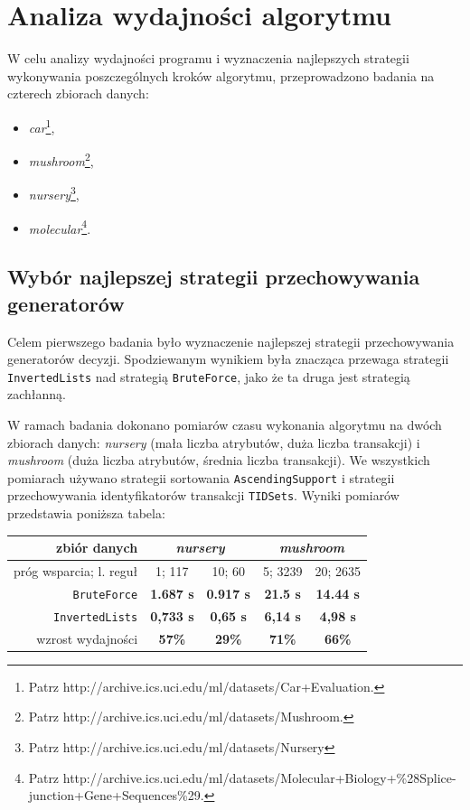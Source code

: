 \documentclass[a4paper,10pt]{article}
\begin{document}
\section{Analiza wydajności algorytmu} \label{sec:anal}
W celu analizy wydajności programu i wyznaczenia najlepszych strategii wykonywania poszczególnych kroków algorytmu, przeprowadzono badania na czterech zbiorach danych:

\begin{itemize}
 \item \emph{car}\footnote{Patrz http://archive.ics.uci.edu/ml/datasets/Car+Evaluation.},
 \item \emph{mushroom}\footnote{Patrz http://archive.ics.uci.edu/ml/datasets/Mushroom.},
 \item \emph{nursery}\footnote{Patrz http://archive.ics.uci.edu/ml/datasets/Nursery},
 \item \emph{molecular}\footnote{Patrz http://archive.ics.uci.edu/ml/datasets/Molecular+Biology+\%28Splice-junction+Gene+Sequences\%29.}.
\end{itemize}


 \subsection{Wybór najlepszej strategii przechowywania generatorów}
 Celem pierwszego badania było wyznaczenie najlepszej strategii przechowywania generatorów decyzji.
 Spodziewanym wynikiem była znacząca przewaga strategii \verb+InvertedLists+ nad strategią \verb+BruteForce+, jako że ta druga jest strategią zachłanną.
 
 W ramach badania dokonano pomiarów czasu wykonania algorytmu na dwóch zbiorach danych: \emph{nursery} (mała liczba atrybutów, duża liczba transakcji) i \emph{mushroom} (duża liczba atrybutów, średnia liczba transakcji).
 We wszystkich pomiarach używano strategii sortowania \verb+AscendingSupport+ i strategii przechowywania identyfikatorów transakcji \verb+TIDSets+.
 Wyniki pomiarów przedstawia poniższa tabela:
 
 \begin{center}
  \begin{tabular}{ | r || c | c | c | c | }
   \hline
   zbiór danych            & \multicolumn{2}{|c|}{\emph{nursery}} & \multicolumn{2}{|c|}{\emph{mushroom}} \\
   \hline
   próg wsparcia; l. reguł & 1; 117           & 10; 60            & 5; 3239            & 20; 2635          \\
   \hline
   \verb+BruteForce+       & \textbf{1.687 s} & \textbf{0.917 s}  & \textbf{21.5 s}    & \textbf{14.44 s}  \\
   \hline
   \verb+InvertedLists+    & \textbf{0,733 s} & \textbf{0,65 s}   & \textbf{6,14 s}    & \textbf{4,98 s}   \\
   \hline
   wzrost wydajności       & \textbf{57\%}    & \textbf{29\%}     & \textbf{71\%}      & \textbf{66\%}     \\
   \hline
  \end{tabular}
 \end{center}
 
\end{document}
